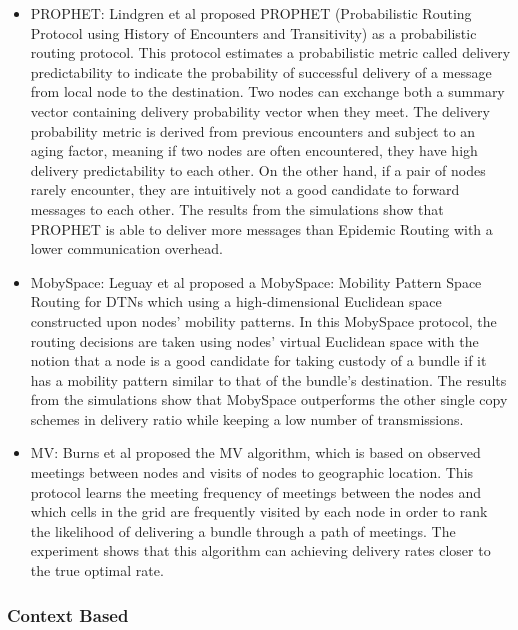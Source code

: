 \label{bg:Opportunistic Networks:Classification of Opportunistic Routing:PB}
	\begin{itemize}
		\item PROPHET:
		Lindgren et al \cite{Lindgren2004} proposed PROPHET (Probabilistic Routing Protocol using History of Encounters and Transitivity) as a probabilistic routing protocol.
		This protocol estimates a probabilistic metric called delivery predictability to indicate the probability of successful delivery of a message from local node to the destination.
		Two nodes can exchange both a summary vector containing delivery probability vector when they meet.
		The delivery probability metric is derived from previous encounters and subject to an aging factor, meaning if two nodes are often encountered, they have high delivery predictability to each other.
		On the other hand, if a pair of nodes rarely encounter, they are intuitively not a good candidate to forward messages to each other.
		The results from the simulations show that PROPHET is able to deliver more messages than Epidemic Routing with a lower communication overhead.
		
		\item MobySpace:
		Leguay et al \cite{Leguay2005,Leguay2006} proposed a MobySpace: Mobility Pattern Space Routing for DTNs which using a high-dimensional Euclidean space constructed upon nodes' mobility patterns.
		In this MobySpace protocol, the routing decisions are taken using nodes’  virtual Euclidean space with the notion that a node is a good candidate for taking custody of a bundle if it has a mobility pattern similar to that of the bundle’s destination.
		The results from the simulations show that MobySpace outperforms the other single copy schemes in delivery ratio while keeping a low number of transmissions.

		\item MV:
		Burns et al \cite{Burns2005} proposed the MV algorithm, which is based on observed meetings between nodes and visits of nodes to geographic location.
		This protocol learns the meeting frequency of meetings between the nodes and which cells in the grid are frequently visited by each node in order to rank the likelihood of delivering a bundle through a path of meetings.
		The experiment shows that this algorithm can achieving delivery rates closer to the true optimal rate.
	\end{itemize}

\subsubsection{Context Based}
\label{bg:Opportunistic Networks:Classification of Opportunistic Routing:CXB}


